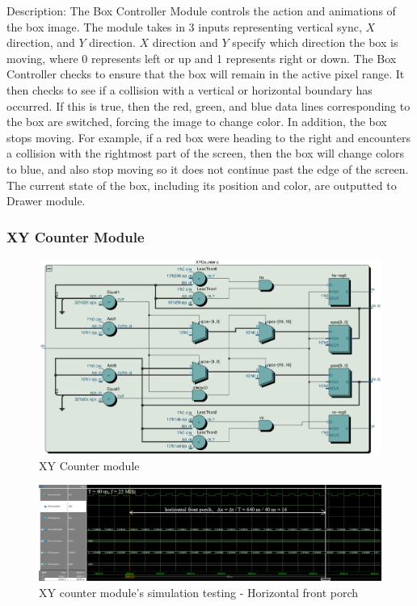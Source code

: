 \documentclass[12pt]{article}
\numberwithin{figure}{subsection}
\begin{document}
Description: The Box Controller Module controls the action and animations of the box image. The module takes in 3 inputs representing vertical sync, $X$ direction, and $Y$ direction. $X$ direction and $Y$ specify which direction the box is moving, where 0 represents left or up and 1 represents right or down. The Box Controller checks to ensure that the box will remain in the active pixel range. It then checks to see if a collision with a vertical or horizontal boundary has occurred. If this is true, then the red, green, and blue data lines corresponding to the box are switched, forcing the image to change color. In addition, the box stops moving. For example, if a red box were heading to the right and encounters a collision with the rightmost part of the screen, then the box will change colors to blue, and also stop moving so it does not continue past the edge of the screen. The current state of the box, including its position and color, are outputted to Drawer module.

\subsubsection{XY Counter Module}

\begin{figure}[ht]
  \centering
  \includegraphics[width=\textwidth]{xycounter.jpg}
  \caption{XY Counter module}
  \label{fig:xycounter}
\end{figure}

\newpage

\begin{figure}[ht]
  \centering
  \includegraphics[width=\textwidth]{xycounter_simulation_horizontal_front_porch.png}
  \caption{XY counter module’s simulation testing - Horizontal front porch}
  \label{fig:xycounter_simulation_horizontal_front_porch}
\end{figure}
\end{document}
